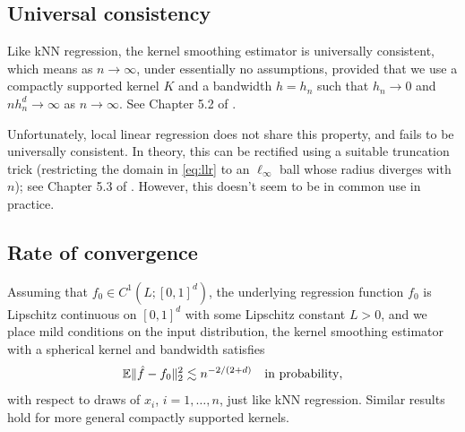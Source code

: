\documentclass{article}
\begin{document}
\subsection{Universal consistency}

Like kNN regression, the kernel smoothing estimator is universally consistent,
which means  as $n \to \infty$, under
essentially no assumptions, provided that we use a compactly supported kernel
$K$ and a bandwidth $h=h_n$ such that $h_n \to 0$ and $nh_n^d \to \infty$ as $n
\to \infty$. See Chapter 5.2 of \citet{gyorfi2002distribution}.  

Unfortunately, local linear regression does not share this property, and fails
to be universally consistent. In theory, this can be rectified using a suitable
truncation trick (restricting the domain in \eqref{eq:llr} to an $\ell_\infty$
ball whose radius diverges with $n$); see Chapter 5.3 of
\citet{gyorfi2002distribution}. However,  this doesn't seem to be in common use
in practice.    

\subsection{Rate of convergence}

Assuming that $f_0 \in C^1(L; [0,1]^d)$, the underlying regression function
$f_0$ is Lipschitz continuous on $[0,1]^d$ with some Lipschitz constant $L>0$,
and we place mild conditions on the input distribution, the kernel smoothing
estimator with a spherical kernel and bandwidth 
satisfies     
\begin{equation}
\label{eq:kernel_rate}
\mathbb{E}\|\hat{f} - f_0\|_2^2 \lesssim n^{-2/(2+d)} \quad \text{in probability},
\end{equation}
with respect to draws of $x_i$, $i=1,\dots,n$, just like kNN regression. Similar
results hold for more general compactly supported kernels. 
\end{document}
